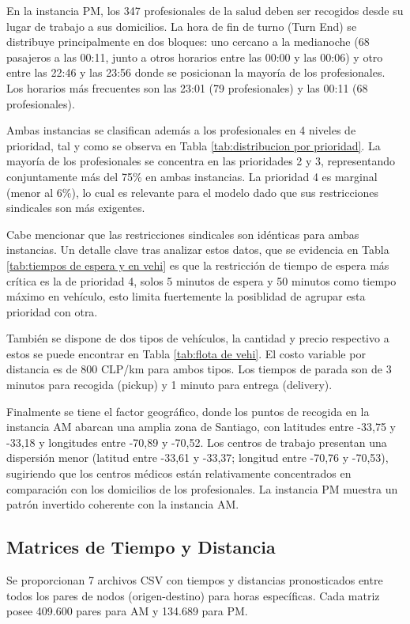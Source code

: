 En la instancia PM, los 347 profesionales de la salud deben ser recogidos desde su lugar de trabajo a sus domicilios. La hora de fin de turno (Turn End) se distribuye principalmente en dos bloques: uno cercano a la medianoche (68 pasajeros a las 00:11, junto a otros horarios entre las 00:00 y las 00:06) y otro entre las 22:46 y las 23:56 donde se posicionan la mayoría de los profesionales. Los horarios más frecuentes son las 23:01 (79 profesionales) y las 00:11 (68 profesionales).

Ambas instancias se clasifican además a los profesionales en 4 niveles de prioridad, tal y como se observa en Tabla \ref{tab:distribucion por prioridad}. La mayoría de los profesionales se concentra en las prioridades 2 y 3, representando conjuntamente más del 75\% en ambas instancias. La prioridad 4 es marginal (menor al 6\%), lo cual es relevante para el modelo dado que sus restricciones sindicales son más exigentes. 

Cabe mencionar que las restricciones sindicales son idénticas para ambas instancias. Un detalle clave tras analizar estos datos, que se evidencia en Tabla \ref{tab:tiempos de espera y en vehi} es que la restricción de tiempo de espera más crítica es la de prioridad 4, solos 5 minutos de espera y 50 minutos como tiempo máximo en vehículo, esto limita fuertemente la posiblidad de agrupar esta prioridad con otra.

También se dispone de dos tipos de vehículos, la cantidad y precio respectivo a estos se puede encontrar en Tabla \ref{tab:flota de vehi}. El costo variable por distancia es de 800 CLP/km para ambos tipos. Los tiempos de parada son de 3 minutos para recogida (pickup) y 1 minuto para entrega (delivery).

Finalmente se tiene el factor geográfico, donde los puntos de recogida en la instancia AM abarcan una amplia zona de Santiago, con latitudes entre -33,75 y -33,18 y longitudes entre -70,89 y -70,52. Los centros de trabajo presentan una dispersión menor (latitud entre -33,61 y -33,37; longitud entre -70,76 y -70,53), sugiriendo que los centros médicos están relativamente concentrados en comparación con los domicilios de los profesionales. La instancia PM muestra un patrón invertido coherente con la instancia AM.

\subsection{Matrices de Tiempo y Distancia}

Se proporcionan 7 archivos CSV con tiempos y distancias pronosticados entre todos los pares de nodos (origen-destino) para horas específicas. Cada matriz posee 409.600 pares para AM y 134.689 para PM.

